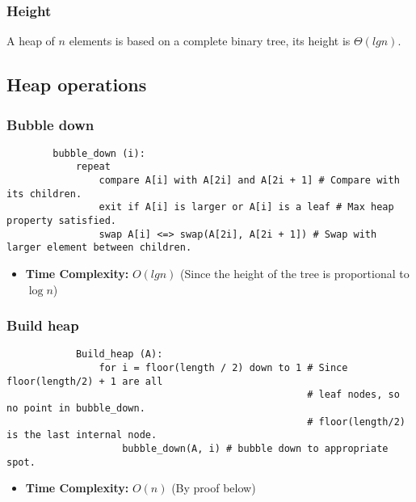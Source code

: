     \subsubsection{Height}
    \begin{definition}
        A heap of $n$ elements is based on a complete binary tree, its height is $\Theta(lg n)$.
    \end{definition}

\subsection{Heap operations}
    \subsubsection{Bubble down}
    \begin{definition}
        \begin{lstlisting}
        bubble_down (i):
            repeat
                compare A[i] with A[2i] and A[2i + 1] # Compare with its children.
                exit if A[i] is larger or A[i] is a leaf # Max heap property satisfied.
                swap A[i] <=> swap(A[2i], A[2i + 1]) # Swap with larger element between children.
        \end{lstlisting}
        \begin{itemize}
            \item \textbf{Time Complexity:} $O(lg n)$ (Since the height of the tree is proportional to $\log n$)
        \end{itemize}

    \end{definition}

    \subsubsection{Build heap}
    \begin{definition}
        \begin{lstlisting}
            Build_heap (A):
                for i = floor(length / 2) down to 1 # Since floor(length/2) + 1 are all
                                                    # leaf nodes, so no point in bubble_down.
                                                    # floor(length/2) is the last internal node.
                    bubble_down(A, i) # bubble down to appropriate spot.
        \end{lstlisting}
        \begin{itemize}
            \item \textbf{Time Complexity:} $O(n)$ (By proof below)
        \end{itemize}


    \end{definition}

